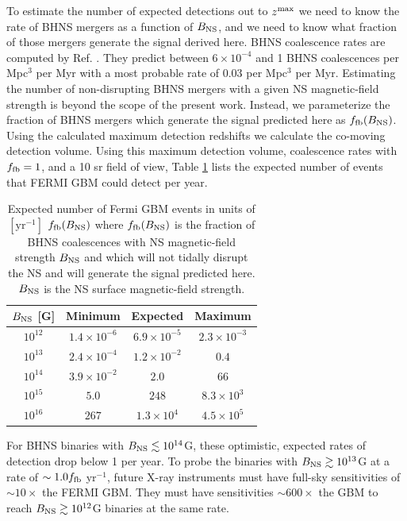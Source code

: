 To estimate the number of expected detections out to $z^{\rm{max}}$ we
need to know the rate of BHNS mergers as a function of $B_{\rm{NS}}$,
and we need to know what fraction of those mergers generate the signal
derived here. BHNS coalescence rates are computed by
Ref. \cite{LIGORates:2010}. They predict between $6 \times 10^{-4}$
and 1 BHNS coalescences per Mpc$^3$ per Myr with a most probable rate
of $0.03$ per Mpc$^3$ per Myr. Estimating the number of non-disrupting
BHNS mergers with a given NS magnetic-field strength is beyond the
scope of the present work. Instead, we parameterize the fraction of
BHNS mergers which generate the signal predicted here as $f_{\rm
  fb}(B_{\rm{NS}})$. Using the calculated maximum detection redshifts
we calculate the co-moving detection volume. Using this maximum
detection volume, coalescence rates with $f_{\rm fb} = 1$, and a 10 sr
field of view, Table \ref{Tab:Rates} lists the expected number of
events that FERMI GBM could detect per year.
\begin{table}
\begin{center}
\begin{tabular}{ c | c | c | c }
%
    $B_{\rm{NS}}$  [G]       & Minimum              & Expected 			    & Maximum   \\
                   \hline 
 $10^{12}$  &   $1.4 \times 10^{-6}$      & $6.9 \times 10^{-5}$     & $2.3 \times 10^{-3}$  \\
 $10^{13}$  &   $ 2.4 \times 10^{-4}$     & $1.2 \times 10^{-2}$     & $0.4$  \\
$10^{14}$  &   $3.9 \times 10^{-2}$       & $2.0$			          & $66$	\\
$10^{15}$  &   $5.0$                              & $248$     		          & $8.3 \times 10^{3}$   \\
$10^{16}$  &   $267$                             & $1.3 \times 10^{4}$       & $4.5 \times 10^{5}$	 
%
 \end{tabular}
\caption{Expected number of Fermi GBM events in units of
  $\left[\mbox{yr}^{-1}\right]$ $f_{\rm fb}(B_{\rm{NS}})$ where
  $f_{\rm fb}(B_{\rm{NS}})$ is the fraction of BHNS coalescences with
  NS magnetic-field strength $B_{\rm{NS}}$ and which will not tidally
  disrupt the NS and will generate the signal predicted here. $B_{\rm{NS}}$
  is the NS surface magnetic-field strength.}
\label{Tab:Rates}
\end{center}
\end{table}

For BHNS binaries with $B_{\rm{NS}} \lesssim 10^{14}$G, these
optimistic, expected rates of detection drop below 1 per year. To
probe the binaries with $B_{\rm{NS}} \gtrsim 10^{13}$G at a rate of
$\sim 1.0 f_{\rm{fb}}$ yr$^{-1}$, future X-ray instruments must have
full-sky sensitivities of $\sim10\times$ the FERMI GBM. They must have
sensitivities $\sim600\times$ the GBM to reach $B_{\rm{NS}} \gtrsim
10^{12}$G binaries at the same rate.

